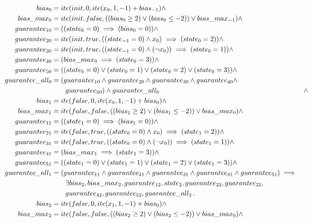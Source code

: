 \begin{equation}
\begin{aligned}
   bias_0&=ite(init, 0, ite(x_0, 1, -1)+bias_{-1}) \land \\
    bias\_max_0&=ite(init, false, ((bias_0\ge 2)\lor (bias_0\le -2))\lor bias\_max_{-1})\land \\
    guarantee_{10}&=((state_0=0)\implies(bias_0=0))\land \\
    guarantee_{20}&=ite(init, true, ((state_{-1}=0)\land x_0)\implies(state_0=2))\land \\
    guarantee_{30}&=ite(init, true, ((state_{-1}=0)\land (\neg x_0))\implies(state_0=1))\land \\
    guarantee_{40}&=(bias\_max_0\implies(state_0=3))\land \\
    guarantee_{50}&=((state_0=0) \lor (state_0=1) \lor (state_0=2) \lor (state_0=3))\land \\
    guarantee\_all_0&=(guarantee_{10}\land guarantee_{20}\land
    guarantee_{30}\land guarantee_{40} \land \\ &\qquad {} guarantee_{50}) 
    \land guarantee\_all_0 &\land \\
    bias_1&=ite(false, 0, ite(x_0, 1, -1)+bias_0)\land \\
    bias\_max_1&=ite(false, false, ((bias_1\ge 2)\lor (bias_1\le-2))\lor bias\_max_0)\land \\
    guarantee_{11}&=((state_1=0)\implies(bias_1=0))\land \\
    guarantee_{21}&=ite(false, true, ((state_0=0)\land x_0)\implies(state_1=2))\land \\
    guarantee_{31}&=ite(false, true, ((state_0=0)\land (\neg x_0))\implies(state_1=1))\land \\
    guarantee_{41}&=(bias\_max_1\implies(state_1=3))\land \\
    guarantee_{51}&=((state_1=0) \lor (state_1=1) \lor (state_1=2) \lor (state_1=3))\land \\
    guarantee\_all_1&=(guarantee_{11}\land guarantee_{21}\land guarantee_{31}\land guarantee_{41} \land guarantee_{51})
\implies \\ &\qquad {}
\exists bias_2, bias\_max_2, guarantee_{12}, state_2, guarantee_{22},
guarantee_{32}, \\ &\qquad {} guarantee_{42}, guarantee_{52}, guarantee\_all_2
\such  \\
  bias_2&=ite(false, 0, ite(x_1, 1, -1)+bias_0) \land\\
  bias\_max_2&=ite(false, false, ((bias_2\ge 2) \lor (bias_2\le -2)) \lor bias\_max_0) \land\\

\end{aligned}
\end{equation}
